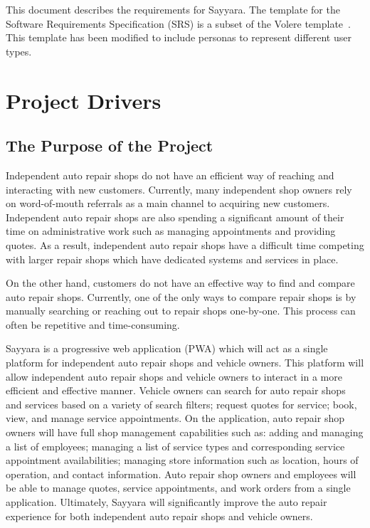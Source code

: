 \documentclass[12pt]{article}
\begin{document}
\newpage


This document describes the requirements for Sayyara. The template for the Software Requirements
Specification (SRS) is a subset of the Volere template~\citep{RobertsonAndRobertson2012}. This
template has been modified to include personas to represent different user types.

\section{Project Drivers}

\subsection{The Purpose of the Project}

Independent auto repair shops do not have an efficient way of reaching and interacting with new
customers. Currently, many independent shop owners rely on word-of-mouth referrals as a main
channel to acquiring new customers. Independent auto repair shops are also spending a significant
amount of their time on administrative work such as managing appointments and providing quotes. As
a result, independent auto repair shops have a difficult time competing with larger repair shops
which have dedicated systems and services in place.

On the other hand, customers do not have an effective way to find and compare auto repair shops.
Currently, one of the only ways to compare repair shops is by manually searching or reaching out to
repair shops one-by-one. This process can often be repetitive and time-consuming.

Sayyara is a progressive web application (PWA) which will act as a single platform for independent
auto repair shops and vehicle owners. This platform will allow independent auto repair shops and
vehicle owners to interact in a more efficient and effective manner. Vehicle owners can search for
auto repair shops and services based on a variety of search filters; request quotes for service;
book, view, and manage service appointments. On the application, auto repair shop owners will have
full shop management capabilities such as: adding and managing a list of employees; managing a list
of service types and corresponding service appointment availabilities; managing store information
such as location, hours of operation, and contact information. Auto repair shop owners and
employees will be able to manage quotes, service appointments, and work orders from a single
application. Ultimately, Sayyara will significantly improve the auto repair experience for both
independent auto repair shops and vehicle owners.
\end{document}
